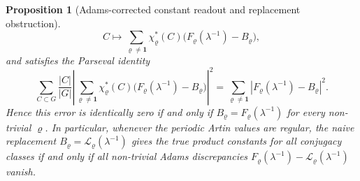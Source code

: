 \documentclass[11pt,a4paper]{amsart}
\theoremstyle{plain}
\newtheorem{proposition}[theorem]{Proposition}
\theoremstyle{definition}
\theoremstyle{remark}
\begin{document}
\begin{proposition}[Adams-corrected constant readout and replacement obstruction]
\begin{equation}
    C\longmapsto
    \sum_{\varrho\neq\mathbf1}
      \chi_\varrho^\ast(C)
      \bigl(F_\varrho(\lambda^{-1})-B_\varrho\bigr),
  \end{equation}
  and satisfies the Parseval identity
  \begin{equation}\label{eq:classical-layer-replacement-parseval}
    \sum_{C\subset G}\frac{|C|}{|G|}
    \left|\sum_{\varrho\neq\mathbf1}
      \chi_\varrho^\ast(C)
      \bigl(F_\varrho(\lambda^{-1})-B_\varrho\bigr)\right|^2
    =
    \sum_{\varrho\neq\mathbf1}
      \left|F_\varrho(\lambda^{-1})-B_\varrho\right|^2 .
  \end{equation}
  Hence this error is identically zero if and only if
  \(B_\varrho=F_\varrho(\lambda^{-1})\) for every non-trivial
  \(\varrho\).  In particular, whenever the periodic Artin values are regular,
  the naive replacement
  \(B_\varrho=\mathcal L_\varrho(\lambda^{-1})\) gives the true product
  constants for all conjugacy classes if and only if all non-trivial Adams
  discrepancies
  \(F_\varrho(\lambda^{-1})-\mathcal L_\varrho(\lambda^{-1})\) vanish.
\end{proposition}
\end{document}
